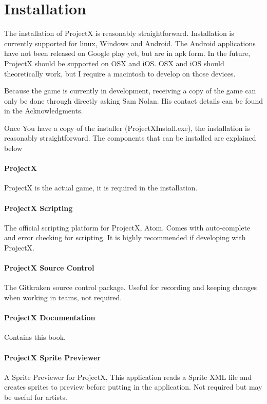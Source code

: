 \documentclass{book}
\begin{document}
	\section{Installation}
	The installation of ProjectX is reasonably straightforward. Installation is currently supported for linux, Windows and Android. The Android applications have not been released on Google play yet, but are in apk form. In the future, ProjectX should be supported on OSX and iOS. OSX and iOS should theoretically work, but I require a macintosh to develop on those devices.
	
	Because the game is currently in development, receiving a copy of the game can only be done through directly asking Sam Nolan. His contact details can be found in the Acknowledgments.  
	
	Once You have a copy of the installer (ProjectXInstall.exe), the installation is reasonably straightforward. The components that can be installed are explained below
	
	\paragraph{ProjectX}
	ProjectX is the actual game, it is required in the installation.
	
	\paragraph{ProjectX Scripting}
	The official scripting platform for ProjectX, Atom. Comes with auto-complete and error checking for scripting. It is highly recommended if developing with ProjectX.
	
	\paragraph{ProjectX Source Control}
	The Gitkraken source control package. Useful for recording and keeping changes when working in teams, not required.
	
	\paragraph{ProjectX Documentation}
	Contains this book.
	
	\paragraph{ProjectX Sprite Previewer}
	A Sprite Previewer for ProjectX, This application reads a Sprite XML file  and creates sprites to preview before putting in the application. Not required but may be useful for artists.
	
\end{document}

